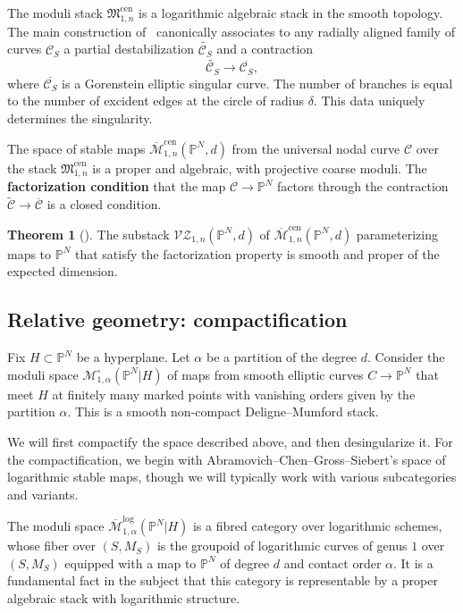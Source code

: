 \documentclass[11pt]{amsart}
\renewcommand{\to}{\rightarrow}
\theoremstyle{definition}
\newtheorem{thm}{Theorem}[section]
\theoremstyle{definition}
\begin{document}
The moduli stack $\mathfrak M_{1,n}^{\mathrm{cen}}$ is a logarithmic algebraic stack in the smooth topology. The main construction of~\cite{RSPW} canonically associates to any radially aligned family of curves $\mathcal C_S$ a partial destabilization $\widetilde{\mathcal C_S}$ and a contraction
\[
\widetilde{\mathcal C_S}\to \overline{\mathcal C_S},
\]
where $\overline{\mathcal C_S}$ is a Gorenstein elliptic singular curve. The number of branches is equal to the number of excident edges at the circle of radius $\delta$. This data uniquely determines the singularity.

The space of stable maps $\overline{\mathcal M}^{\mathrm{cen}}_{1,n}(\mathbb P^N,d)$ from the universal nodal curve $\mathcal C$ over the stack $\mathfrak M_{1,n}^{\mathrm{cen}}$ is a proper and algebraic, with projective coarse moduli. The \textbf{factorization condition} that the map $\mathcal C\to \mathbb P^N$ factors through the contraction $\widetilde{\mathcal C}\to \overline{\mathcal C}$ is a closed condition. 
\begin{thm}[{\cite[Theorem B]{RSPW}}]
The substack $\mathcal{VZ}_{1,n}(\mathbb P^N,d)$ of $\overline{\mathcal M}^{\mathrm{cen}}_{1,n}(\mathbb P^N,d)$ parameterizing maps to $\mathbb P^N$ that satisfy the factorization property is smooth and proper of the expected dimension.
\end{thm}

\subsection{Relative geometry: compactification} Fix $H\subset \mathbb P^N$ be a hyperplane. Let $\alpha$ be a partition of the degree $d$. Consider the moduli space $\mathcal M_{1,\alpha}^\circ(\mathbb P^N|H)$ of maps from smooth elliptic curves $C\to \mathbb P^N$ that meet $H$ at finitely many marked points with vanishing orders given by the partition $\alpha$. This is a smooth non-compact Deligne--Mumford stack. 

We will first compactify the space described above, and then desingularize it. For the compactification, we begin with Abramovich--Chen--Gross--Siebert's space of logarithmic stable maps, though we will typically work with various subcategories and variants. 

The moduli space $\overline{\mathcal{M}}^{\operatorname{log}}_{1,\alpha}(\mathbb P^N|H)$ is a fibred category over logarithmic schemes, whose fiber over $(S,M_S)$ is the groupoid of logarithmic curves of genus $1$ over $(S,M_S)$ equipped with a map to $\mathbb P^N$ of degree $d$ and contact order $\alpha$. It is a fundamental fact in the subject that this category is representable by a proper algebraic stack with logarithmic structure. 
\end{document}
